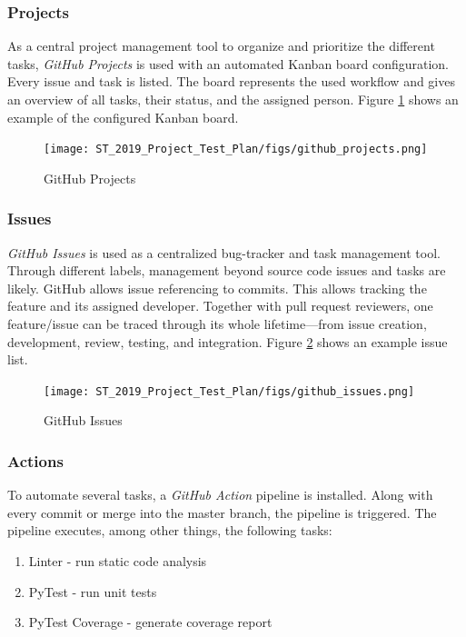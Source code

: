 \documentclass[a4paper]{article}
\begin{document}
\subsubsection{Projects}
As a central project management tool to organize and prioritize the different tasks, \textit{GitHub Projects} is used with an automated Kanban board configuration. Every issue and task is listed. The board represents the used workflow and gives an overview of all tasks, their status, and the assigned person. Figure \ref{fig:github-projects} shows an example of the configured Kanban board.

\begin{figure}[H]
\centering
    \texttt{[image: ST\_2019\_Project\_Test\_Plan/figs/github\_projects.png]}
    \caption{GitHub Projects}
    \label{fig:github-projects}
\end{figure}

\subsubsection{Issues}
\label{sec:github-issues}
\textit{GitHub Issues} is used as a centralized bug-tracker and task management tool. Through different labels, management beyond source code issues and tasks are likely. GitHub allows issue referencing to commits. This allows tracking the feature and its assigned developer. Together with pull request reviewers, one feature/issue can be traced through its whole lifetime---from issue creation, development, review, testing, and integration. Figure \ref{fig:github-issues} shows an example issue list.

\begin{figure}[H]
\centering
    \texttt{[image: ST\_2019\_Project\_Test\_Plan/figs/github\_issues.png]}
    \caption{GitHub Issues}
    \label{fig:github-issues}
\end{figure}

\subsubsection{Actions}
\label{sec:github-actions}
To automate several tasks, a \textit{GitHub Action} pipeline is installed. Along with every commit or merge into the master branch, the pipeline is triggered. The pipeline executes, among other things, the following tasks:

\begin{enumerate}
    \item Linter - run static code analysis
    \item PyTest - run unit tests
    \item PyTest Coverage - generate coverage report
\end{enumerate}
\end{document}
